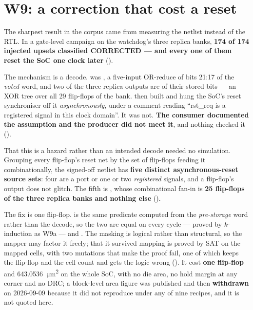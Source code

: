 \section{W9: a correction that cost a reset}
\label{sec:harden-w9}

The sharpest result in the corpus came from measuring the netlist
instead of the RTL. In a gate-level campaign on the watchdog's three
replica banks, \textbf{174 of 174 injected upsets classified CORRECTED
--- and every one of them reset the SoC one clock later}
().

The mechanism is a decode.  was
, a five-input OR-reduce of bits 21:17 of the
\emph{voted} word, and two of the three replica outputs are
 of their stored bits --- an XOR tree over all 29
flip-flops of the bank.  then built
 and hung the SoC's
reset synchroniser off it \emph{asynchronously}, under a comment reading
``rst\_req is a registered signal in this clock domain''. It was not.
\textbf{The consumer documented the assumption and the producer did not
meet it}, and nothing checked it ().

That this is a hazard rather than an intended decode needed no
simulation. Grouping every flip-flop's reset net by the set of
flip-flops feeding it combinationally, the signed-off netlist has
\textbf{five distinct asynchronous-reset source sets}: four are a port
or one or two \emph{registered} signals, and a flip-flop's output does
not glitch. The fifth is , whose combinational fan-in
is \textbf{25 flip-flops of the three replica banks and nothing else}
().

The fix is one flip-flop.  is the same predicate
computed from the \emph{pre-storage} word rather than the decode, so the
two are equal on every cycle --- proved by $k$-induction as W9a --- and
. The masking is
logical rather than structural, so the mapper may factor it freely; that
it survived mapping is proved by SAT on the mapped cells, with two
mutations that make the proof fail, one of which keeps the flip-flop and
the cell count and gets the logic wrong (). It
cost \textbf{one flip-flop} and \SI{+643.0536}{\micro\meter\squared} on
the whole SoC, with no die area, no hold margin at any corner and no
DRC; a block-level area figure was published and then
\textbf{withdrawn} on 2026-09-09 because it did not reproduce under any
of nine recipes, and it is not quoted here.

